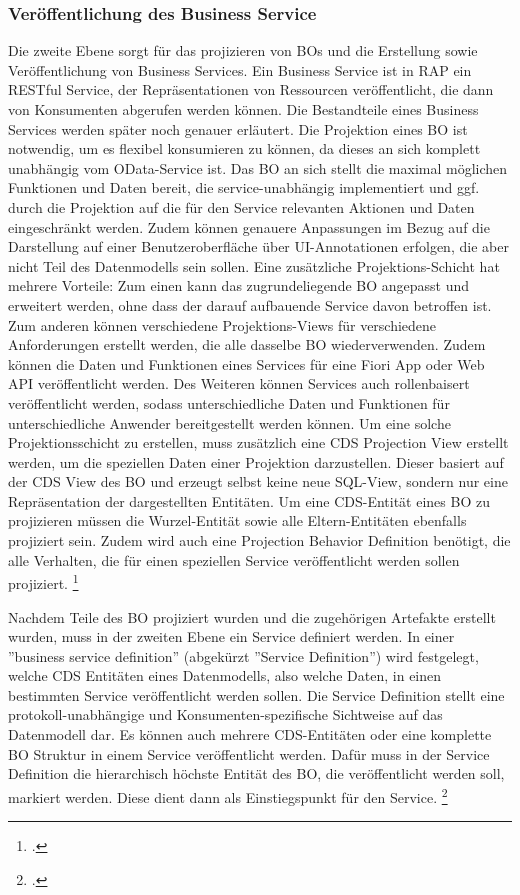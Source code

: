\subsubsection{Veröffentlichung des Business Service}

Die zweite Ebene sorgt für das projizieren von BOs und die Erstellung sowie Veröffentlichung von Business Services. Ein Business Service ist in RAP ein RESTful Service, der Repräsentationen von Ressourcen veröffentlicht, die dann von Konsumenten abgerufen werden können. Die Bestandteile eines Business Services werden später noch genauer erläutert. Die Projektion eines BO ist notwendig, um es flexibel konsumieren zu können, da dieses an sich komplett unabhängig vom OData-Service ist. Das BO an sich stellt die maximal möglichen Funktionen und Daten bereit, die service-unabhängig implementiert und ggf. durch die Projektion auf die für den Service relevanten Aktionen und Daten eingeschränkt werden. Zudem können genauere Anpassungen \zB im Bezug auf die Darstellung auf einer Benutzeroberfläche über UI-Annotationen erfolgen, die aber nicht Teil des Datenmodells sein sollen. Eine zusätzliche Projektions-Schicht hat mehrere Vorteile: Zum einen kann das zugrundeliegende BO angepasst und erweitert werden, ohne dass der darauf aufbauende Service davon betroffen ist. Zum anderen können verschiedene Projektions-Views für verschiedene Anforderungen erstellt werden, die alle dasselbe BO wiederverwenden. Zudem können die Daten und Funktionen eines Services für eine Fiori App oder Web API veröffentlicht werden. Des Weiteren können Services auch rollenbaisert veröffentlicht werden, sodass unterschiedliche Daten und Funktionen für unterschiedliche Anwender bereitgestellt werden können. Um eine solche Projektionsschicht zu erstellen, muss zusätzlich eine CDS Projection View erstellt werden, um die speziellen Daten einer Projektion darzustellen. Dieser basiert auf der CDS View des BO und erzeugt selbst keine neue SQL-View, sondern nur eine Repräsentation der dargestellten Entitäten. Um eine CDS-Entität eines BO zu projizieren müssen die Wurzel-Entität sowie alle Eltern-Entitäten ebenfalls projiziert sein. Zudem wird auch eine Projection Behavior Definition benötigt, die alle Verhalten, die für einen speziellen Service veröffentlicht werden sollen projiziert. \footcite[Vgl.][]{sap_rap_2023}

Nachdem Teile des BO projiziert wurden und die zugehörigen Artefakte erstellt wurden, muss in der zweiten Ebene ein Service definiert werden. In einer ''business service definition'' (abgekürzt ''Service Definition'') wird festgelegt, welche CDS Entitäten eines Datenmodells, also welche Daten, in einen bestimmten Service veröffentlicht werden sollen. Die Service Definition stellt eine protokoll-unabhängige und Konsumenten-spezifische Sichtweise auf das Datenmodell dar. Es können auch mehrere CDS-Entitäten oder eine komplette BO Struktur in einem Service veröffentlicht werden. Dafür muss in der Service Definition die hierarchisch höchste Entität des BO, die veröffentlicht werden soll, markiert werden. Diese dient dann als Einstiegspunkt für den Service. \footcite[Vgl.][]{sap_rap_2023}

